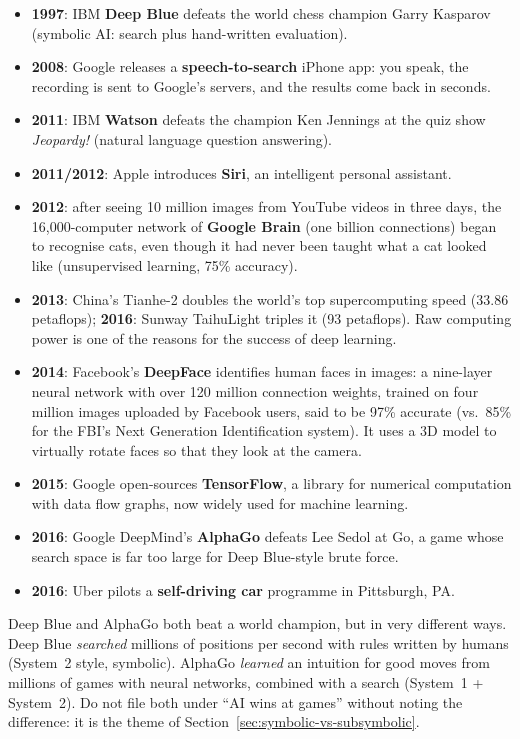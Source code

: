 \begin{itemize}[nosep]
  \item \textbf{1997}: IBM \textbf{Deep Blue} defeats the world chess champion Garry
        Kasparov (symbolic AI: search plus hand-written evaluation).
  \item \textbf{2008}: Google releases a \textbf{speech-to-search} iPhone app: you speak, the
        recording is sent to Google's servers, and the results come back in seconds.
  \item \textbf{2011}: IBM \textbf{Watson} defeats the champion Ken Jennings at the quiz show
        \emph{Jeopardy!} (natural language question answering).
  \item \textbf{2011/2012}: Apple introduces \textbf{Siri}, an intelligent personal assistant.
  \item \textbf{2012}: after seeing 10 million images from YouTube videos in three days, the
        16{,}000-computer network of \textbf{Google Brain} (one billion connections) began to
        recognise cats, even though it had never been taught what a cat looked like
        (unsupervised learning, 75\% accuracy).
  \item \textbf{2013}: China's Tianhe-2 doubles the world's top supercomputing speed (33.86
        petaflops); \textbf{2016}: Sunway TaihuLight triples it (93 petaflops). Raw computing
        power is one of the reasons for the success of deep learning.
  \item \textbf{2014}: Facebook's \textbf{DeepFace} identifies human faces in images: a
        nine-layer neural network with over 120 million connection weights, trained on four
        million images uploaded by Facebook users, said to be 97\% accurate (vs.\ 85\% for
        the FBI's Next Generation Identification system). It uses a 3D model to virtually
        rotate faces so that they look at the camera.
  \item \textbf{2015}: Google open-sources \textbf{TensorFlow}, a library for numerical
        computation with data flow graphs, now widely used for machine learning.
  \item \textbf{2016}: Google DeepMind's \textbf{AlphaGo} defeats Lee Sedol at Go, a game
        whose search space is far too large for Deep Blue-style brute force.
  \item \textbf{2016}: Uber pilots a \textbf{self-driving car} programme in Pittsburgh, PA.
\end{itemize}

\begin{nbwarning}
Deep Blue and AlphaGo both beat a world champion, but in very different ways. Deep Blue
\emph{searched} millions of positions per second with rules written by humans (System~2
style, symbolic). AlphaGo \emph{learned} an intuition for good moves from millions of games
with neural networks, combined with a search (System~1 + System~2). Do not file both under
``AI wins at games'' without noting the difference: it is the theme of
Section~\ref{sec:symbolic-vs-subsymbolic}.
\end{nbwarning}
